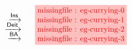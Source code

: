 \setlength{\fboxsep}{2pt}
\setlength{\arraycolsep}{0pt}
\newcommand{\vsp}{\vspace{-0.5em}}
\newcommand{\stkf}{\tikzfig{0.9}{0.5}}
$$
\begin{array}{r@{\quad}c@{\vsp}}
                                  &\stkf{eg-currying-0} \\
       \xstep{\mathsf{Ins}} &\stkf{eg-currying-1} \\
       \xstep{\mathsf{Deit}} &\stkf{eg-currying-2} \\
       \xstep{\mathsf{BA}} &\stkf{eg-currying-3}
\end{array}
$$
